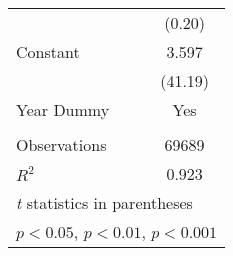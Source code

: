 \begin{table}[htbp]
\begin{tabular}{l*{1}{c}}
                    &      (0.20)         \\
[1em]
Constant            &       3.597\sym{***}\\
                    &     (41.19)         \\
[1em]
Year Dummy          &      Yes \\
                    &              \\
\hline
Observations        &       69689         \\
\(R^{2}\)           &       0.923         \\
\hline\hline
\multicolumn{2}{l}{\footnotesize \textit{t} statistics in parentheses}\\
\multicolumn{2}{l}{\footnotesize \sym{*} \(p<0.05\), \sym{**} \(p<0.01\), \sym{***} \(p<0.001\)}\\
\end{tabular}
\end{table}
